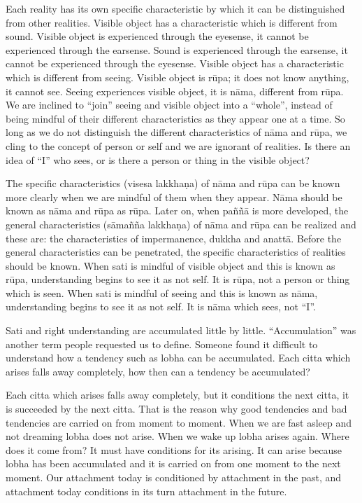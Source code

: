 Each reality has its own specific characteristic by which it can be
distinguished from other realities. Visible object has a characteristic
which is different from sound. Visible object is experienced through the
eyesense, it cannot be experienced through the earsense. Sound is
experienced through the earsense, it cannot be experienced through the
eyesense. Visible object has a characteristic which is different from
seeing. Visible object is rūpa; it does not know anything, it cannot
see. Seeing experiences visible object, it is nāma, different from rūpa.
We are inclined to ``join'' seeing and visible object into a ``whole'',
instead of being mindful of their different characteristics as they
appear one at a time. So long as we do not distinguish the different
characteristics of nāma and rūpa, we cling to the concept of person or
self and we are ignorant of realities. Is there an idea of ``I'' who
sees, or is there a person or thing in the visible object?

The specific characteristics (visesa lakkhaṇa) of nāma and rūpa can be
known more clearly when we are mindful of them when they appear. Nāma
should be known as nāma and rūpa as rūpa. Later on, when paññā is more
developed, the general characteristics (sāmañña lakkhaṇa) of nāma and
rūpa can be realized and these are: the characteristics of impermanence,
dukkha and anattā. Before the general characteristics can be penetrated,
the specific characteristics of realities should be known. When sati is
mindful of visible object and this is known as rūpa, understanding
begins to see it as not self. It is rūpa, not a person or thing which is
seen. When sati is mindful of seeing and this is known as nāma,
understanding begins to see it as not self. It is nāma which sees, not
``I''.

Sati and right understanding are accumulated little by little.
``Accumulation'' was another term people requested us to define. Someone
found it difficult to understand how a tendency such as lobha can be
accumulated. Each citta which arises falls away completely, how then can
a tendency be accumulated?

Each citta which arises falls away completely, but it conditions the
next citta, it is succeeded by the next citta. That is the reason why
good tendencies and bad tendencies are carried on from moment to moment.
When we are fast asleep and not dreaming lobha does not arise. When we
wake up lobha arises again. Where does it come from? It must have
conditions for its arising. It can arise because lobha has been
accumulated and it is carried on from one moment to the next moment. Our
attachment today is conditioned by attachment in the past, and
attachment today conditions in its turn attachment in the future.

